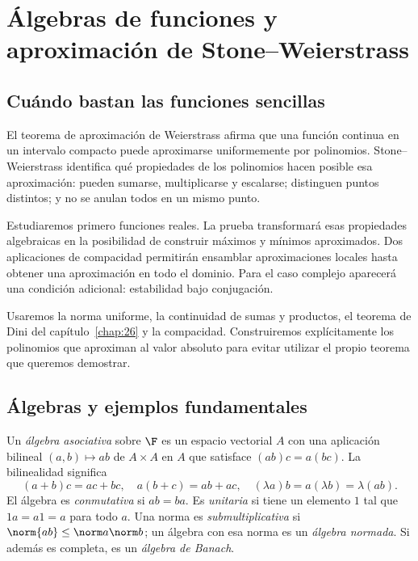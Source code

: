 \chapter{Álgebras de funciones y aproximación de Stone--Weierstrass}\label{chap:28}

\section{Cuándo bastan las funciones sencillas}
El teorema de aproximación de Weierstrass afirma que una función continua en un intervalo compacto puede aproximarse uniformemente por polinomios. Stone--Weierstrass identifica qué propiedades de los polinomios hacen posible esa aproximación: pueden sumarse, multiplicarse y escalarse; distinguen puntos distintos; y no se anulan todos en un mismo punto.

Estudiaremos primero funciones reales. La prueba transformará esas propiedades algebraicas en la posibilidad de construir máximos y mínimos aproximados. Dos aplicaciones de compacidad permitirán ensamblar aproximaciones locales hasta obtener una aproximación en todo el dominio. Para el caso complejo aparecerá una condición adicional: estabilidad bajo conjugación.

Usaremos la norma uniforme, la continuidad de sumas y productos, el teorema de Dini del capítulo~\ref{chap:26} y la compacidad. Construiremos explícitamente los polinomios que aproximan al valor absoluto para evitar utilizar el propio teorema que queremos demostrar.

\section{Álgebras y ejemplos fundamentales}
\begin{definicion}
Un \emph{álgebra asociativa} sobre $\F$ es un espacio vectorial $A$ con una aplicación bilineal $(a,b)\mapsto ab$ de $A\times A$ en $A$ que satisface $(ab)c=a(bc)$. La bilinealidad significa
\[
 (a+b)c=ac+bc,\quad a(b+c)=ab+ac,\quad
 (\lambda a)b=a(\lambda b)=\lambda(ab).
\]
El álgebra es \emph{conmutativa} si $ab=ba$. Es \emph{unitaria} si tiene un elemento $1$ tal que $1a=a1=a$ para todo $a$. Una norma es \emph{submultiplicativa} si $\norm{ab}\le\norm a\norm b$; un álgebra con esa norma es un \emph{álgebra normada}. Si además es completa, es un \emph{álgebra de Banach}.
\end{definicion}

